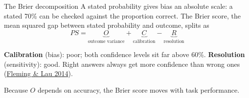 \documentclass[aspectratio=169,11pt]{beamer}
\newcommand{\FL}{\href{https://www.frontiersin.org/articles/10.3389/fnhum.2014.00443/pdf}{Fleming \& Lau 2014}}
\begin{document}
\begin{frame}[label=brier]{The Brier decomposition}
A stated probability gives bias an absolute scale: a stated 70\% can be checked against the proportion correct. The Brier score, the mean squared gap between stated probability and outcome, splits as
\vspace{-0.3em}
\[
PS = \underbrace{O}_{\text{outcome variance}} + \underbrace{C}_{\text{calibration}} - \underbrace{R}_{\text{resolution}}
\]

\vspace{-0.3em}
\begin{center}
\end{center}

\vspace{-0.8em}
{\small
\textbf{Calibration} (bias): poor; both confidence levels sit far above 60\%.
\textbf{Resolution} (sensitivity): good. Right answers always get more confidence than wrong ones (\FL).}

{\footnotesize Because $O$ depends on accuracy, the Brier score moves with task performance.}
\end{frame}
\end{document}
